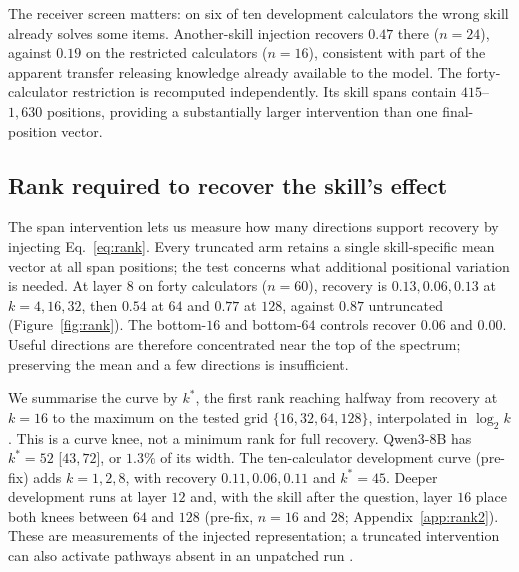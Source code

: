 \documentclass{article}
\begin{document}
\begin{table}[t]
\caption{Span interventions on forty calculators, restricted to $60$ items from
$15$ calculators whose wrong-skill receiver solves none. Recovery uses
Eq.~\ref{eq:rho}. Accuracy intervals retain the original item-level normal
approximation; the group-bootstrap interval for transplant recovery is reported
in Table~\ref{tab:replication}. The final rows are identity and unpatched controls.}
\label{tab:big40}
\centering
\small

\end{table}

The receiver screen matters: on six of ten development calculators the wrong
skill already solves some items. Another-skill injection recovers $0.47$ there
($n=24$), against $0.19$ on the restricted calculators ($n=16$), consistent with
part of the apparent transfer releasing knowledge already available to the
model. The forty-calculator restriction is recomputed independently. Its skill
spans contain $415$--$1{,}630$ positions, providing a substantially larger
intervention than one final-position vector.

\subsection{Rank required to recover the skill's effect}
\label{sec:rank}

The span intervention lets us measure how many directions support recovery by
injecting Eq.~\ref{eq:rank}. Every truncated arm retains a single skill-specific
mean vector at all span positions; the test concerns what additional positional
variation is needed. At layer $8$ on forty calculators ($n=60$), recovery is
$0.13,0.06,0.13$ at $k=4,16,32$, then $0.54$ at $64$ and $0.77$ at $128$,
against $0.87$ untruncated (Figure~\ref{fig:rank}). The bottom-$16$ and bottom-$64$
controls recover $0.06$ and $0.00$. Useful directions are therefore concentrated
near the top of the spectrum; preserving the mean and a few directions is
insufficient.

We summarise the curve by $k^{*}$, the first rank reaching halfway from recovery
at $k=16$ to the maximum on the tested grid $\{16,32,64,128\}$, interpolated in
$\log_2 k$. This is a curve knee, not a minimum rank for full recovery. Qwen3-8B
has $k^{*}=52$ [$43,72$], or $1.3\%$ of its width. The ten-calculator development
curve (pre-fix) adds $k=1,2,8$, with recovery $0.11,0.06,0.11$ and $k^{*}=45$.
Deeper development runs at layer $12$ and, with the skill after the question,
layer $16$ place both knees between $64$ and $128$ (pre-fix, $n=16$ and $28$;
Appendix~\ref{app:rank2}). These are measurements of the injected representation;
a truncated intervention can also activate pathways absent in an unpatched run
\citep{makelov2024illusion}.
\end{document}
